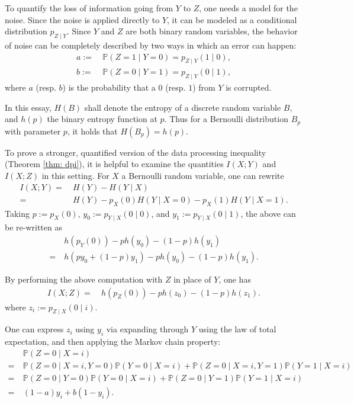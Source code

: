 \documentclass[12pt,reqno]{amsart}
\theoremstyle{plain} %
\theoremstyle{remark}
\theoremstyle{definition}
\renewcommand{\P}{\mathbb P}
\begin{document}
To quantify the loss of information going from $Y$ to $Z$, one needs a model for the noise. Since the noise is applied directly to $Y$, it can be modeled as a conditional distribution $p_{Z\mid Y}$. Since $Y$ and $Z$ are both binary random variables, the behavior of noise can be completely described by two ways in which an error can happen: 
\begin{align}
    a:=&\ \P(Z=1\mid Y=0)=p_{Z\mid Y}(1\mid 0),\\
    b:=&\ \P(Z=0\mid Y=1)=p_{Z\mid Y}(0\mid 1),
\end{align}
where $a$ (resp. $b$) is the probability that a $0$ (resp. $1$) from $Y$ is corrupted.

In this essay, $H(B)$ shall denote the entropy of a discrete random variable $B$, and $h(p)$ the binary entropy function at $p$. Thus for a Bernoulli distribution $B_p$ with parameter $p$, it holds that $H(B_p)=h(p)$.

To prove a stronger, quantified version of the data processing inequality (Theorem \ref{thm: dpi}), it is helpful to examine the quantities $I(X;Y)$ and $I(X;Z)$ in this setting. For $X$ a Bernoulli random variable, one can rewrite
\begin{align}
    I(X;Y)=&\ H(Y)-H(Y\mid X)\\
    =&\ H(Y)-p_X(0)H(Y\mid X=0)-p_X(1)H(Y\mid X=1).
\end{align}
Taking $p:=p_X(0)$, $y_0:=p_{Y\mid X}(0\mid 0)$, and $y_1:=p_{Y\mid X}(0\mid 1)$, the above can be re-written as
\begin{align}
    &\ h(p_Y(0))-ph(y_0)-(1-p)h(y_1)\\
     =&\ h(py_0+(1-p)y_1)-ph(y_0)-(1-p)h(y_1).
\end{align}

By performing the above computation with $Z$ in place of $Y$, one has
\begin{align}
    I(X;Z)=&\ h(p_Z(0))-ph(z_0)-(1-p)h(z_1).
\end{align}
where $z_i:=p_{Z\mid X}(0\mid i)$. 

One can express $z_i$ using $y_i$ via expanding through $Y$ using the law of total expectation, and then applying the Markov chain property:
\begin{align}
    &\ \P(Z=0\mid X=i)\\
    =&\ \P(Z=0\mid X=i,Y=0)\P(Y=0\mid X=i)+\P(Z=0\mid X=i,Y=1)\P(Y=1\mid X=i)\\
    =&\ \P(Z=0\mid Y=0)\P(Y=0\mid X=i)+\P(Z=0\mid Y=1)\P(Y=1\mid X=i)\\
    =&\ (1-a)y_i+b(1-y_i).
\end{align}
\end{document}
